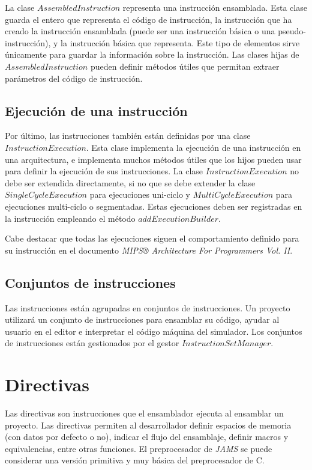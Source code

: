 La clase $AssembledInstruction$ representa una instrucción ensamblada.
Esta clase guarda el entero que representa el código de instrucción,
la instrucción que ha creado la instrucción ensamblada
(puede ser una instrucción básica o una pseudo-instrucción),
y la instrucción básica que representa.
Este tipo de elementos sirve únicamente para guardar
la información sobre la instrucción.
Las clases hijas de $AssembledInstruction$ pueden definir métodos útiles
que permitan extraer parámetros del código de instrucción.

\subsection{Ejecución de una instrucción}\label{subsec:ejecución-de-una-instruccion}

Por último, las instrucciones también están definidas por una clase
$InstructionExecution$.
Esta clase implementa la ejecución de una instrucción en una arquitectura,
e implementa muchos métodos útiles que los hijos pueden usar para definir
la ejecución de sus instrucciones.
La clase $InstructionExecution$ no debe ser extendida directamente,
si no que se debe extender la clase $SingleCycleExecution$
para ejecuciones uni-ciclo y $MultiCycleExecution$ para ejecuciones
multi-ciclo o segmentadas.
Estas ejecuciones deben ser registradas en la instrucción
empleando el método $addExecutionBuilder$.

\noindent Cabe destacar que todas las ejecuciones siguen el comportamiento
definido para su instrucción en el documento
\textit{MIPS® Architecture For Programmers Vol. II}\cite{MIPS_VOL_2}.

\subsection{Conjuntos de instrucciones}\label{subsec:conjuntos-de-instrucciones}

Las instrucciones están agrupadas en conjuntos de instrucciones.
Un proyecto utilizará un conjunto de instrucciones para ensamblar su código,
ayudar al usuario en el editor e interpretar el código máquina del simulador.
Los conjuntos de instrucciones están gestionados por el gestor
$InstructionSetManager$.


\section{Directivas}\label{sec:directivas}

Las directivas son instrucciones que el ensamblador ejecuta al
ensamblar un proyecto.
Las directivas permiten al desarrollador definir espacios de memoria
(con datos por defecto o no), indicar el flujo del ensamblaje,
definir macros y equivalencias, entre otras funciones.
El preprocesador de \textit{JAMS} se puede considerar una versión primitiva
y muy básica del preprocesador de C\cite{C_PREPROCESSOR}.

